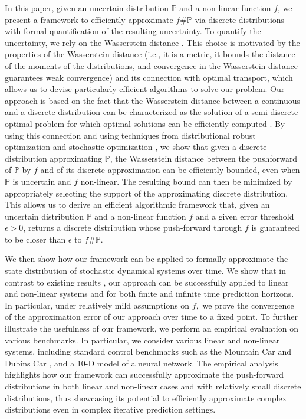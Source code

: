\documentclass[11pt, a4paper, oneside,reqno]{amsart}
\theoremstyle{plain}
\def\prob{\mathbb{P}}
\begin{document}
In this paper, given an uncertain distribution $\prob$ and a non-linear function $f$, we present a framework to efficiently approximate $f\#\prob$ via discrete distributions with formal quantification of the resulting uncertainty. To quantify the uncertainty, we rely on the Wasserstein distance \cite{villani2009optimal}. This choice is motivated by the properties of the Wasserstein distance (i.e., it is a metric, it bounds the distance of the moments of the distributions, and convergence in the Wasserstein distance guarantees weak convergence) and its connection with optimal transport, which allows us to devise particularly efficient algorithms to solve our problem. Our approach is based on the fact that the Wasserstein distance between a continuous and a discrete distribution can be characterized as the solution of a semi-discrete optimal problem for which optimal solutions can be efficiently computed \cite{peyre2019computational}.
By using this connection and using techniques from distributional robust optimization and stochastic optimization \cite{ben2009robust, bertsimas2004price, mohajerin2018data, gao2023distributionally}, we show that given a discrete distribution approximating $\prob$, the Wasserstein distance between the pushforward of $\prob$  by $f$  and of its discrete approximation can be efficiently bounded, even when $\prob$ is uncertain and $f$ non-linear. The resulting bound can then be minimized by appropriately selecting the support of the approximating discrete distribution. This allows us to derive an efficient algorithmic framework that, given an uncertain distribution $\prob$ and a non-linear function $f$ and a given error threshold $\epsilon>0$, returns a discrete distribution whose push-forward through $f$ is guaranteed to be closer than $\epsilon$ to $f\#\prob$.

We then show how our framework can be applied to formally approximate the state distribution of stochastic dynamical systems over time. We show that in contrast to existing results \cite{aolaritei2022distributional,figueiredo2024uncertainty}, our approach can be successfully applied to linear and non-linear systems 
and for both finite and infinite time prediction horizons. In particular, under relatively mild assumptions on $f,$ we prove the convergence of the approximation error of our approach over time to a fixed point. To further illustrate the usefulness of our framework, we perform an empirical evaluation on various benchmarks. In particular, we consider various linear and non-linear systems, including standard control benchmarks such as the Mountain Car \cite{singh1996reinforcement} and Dubins Car \cite{balkcom2018dubins}, and a 10-D model of a neural network. 
The empirical analysis highlights how our framework can successfully approximate the push-forward distributions in both linear and non-linear cases and with relatively small discrete distributions, thus showcasing its potential to efficiently approximate complex distributions even in complex iterative prediction settings.
    
\end{document}
